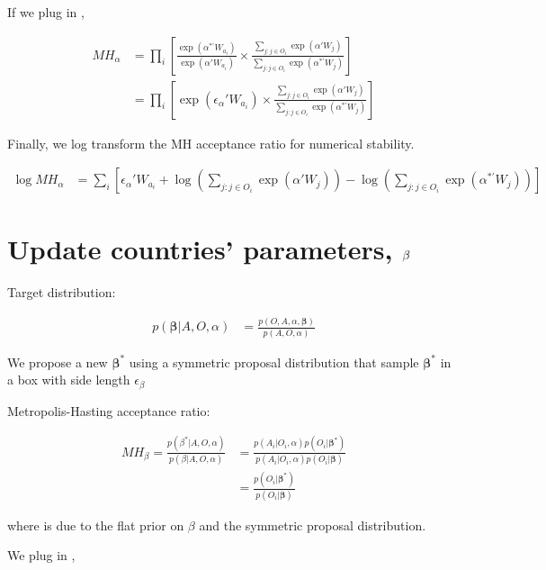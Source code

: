 \documentclass[12pt]{article}
\begin{document}
If we plug in ,

\begin{align}
MH_\alpha &= \prod_i \left[ \frac{\exp(\alpha^{*\prime} W_{a_i})}{\exp(\alpha' W_{a_i})} \times \frac{\sum\limits_{j:j \in O_i} \exp(\alpha' W_j)}{\sum\limits_{j:j \in O_i} \exp(\alpha^{*\prime}W_j)} \right] \\
&= \prod_i \left[ \exp(\epsilon_\alpha ' W_{a_i}) \times \frac{\sum\limits_{j:j \in O_i} \exp(\alpha' W_j)}{\sum\limits_{j:j \in O_i} \exp(\alpha^{*\prime}W_j)} \right]
\end{align}

Finally, we log transform the MH acceptance ratio for numerical stability.

\begin{align}
\log MH_\alpha &= \sum_i \left[ \epsilon_\alpha' W_{a_i} + \log\left(\sum\limits_{j:j \in O_i} \exp(\alpha' W_j)\right) - \log\left(\sum\limits_{j:j \in O_i} \exp(\alpha^{*\prime} W_j)\right) \right]
\end{align}

\section{Update countries' parameters, \texorpdfstring{$\boldmath\beta$}{}}

Target distribution:

\begin{align}
p(\bm{\beta}|A, O, \alpha) &= \frac{p(O, A, \alpha, \bm{\beta})}{p(A, O, \alpha)}
\end{align}

We propose a new $\bm{\beta}^*$ using a symmetric proposal distribution that sample $\bm{\beta}^*$ in a box with side length $\epsilon_\beta$

Metropolis-Hasting acceptance ratio:

\begin{align}
MH_\beta = \frac{p(\beta^* | A, O, \alpha)}{p(\beta | A, O, \alpha)} &= \frac{p(A_i | O_i, \alpha)p(O_i|\bm{\beta}^*)}{p(A_i | O_i, \alpha)p(O_i|\bm{\beta})} \label{eq:updatebeta_MHratio_simplify} \\
&= \frac{p(O_i|\bm{\beta}^*)}{p(O_i|\bm{\beta})} \label{eq:updatebeta_MHratio_final}
\end{align}

where  is due to the flat prior on $\beta$ and the symmetric proposal distribution.

We plug in ,
\end{document}
